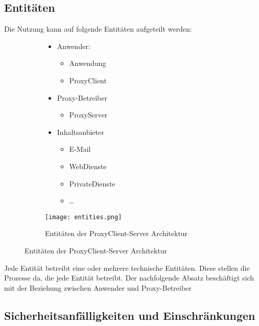 \documentclass[12pt, a4paper]{scrartcl}
\begin{document}
\subsection{Entitäten}
Die Nutzung kann auf folgende Entitäten aufgeteilt werden:
\begin{figure}[H]
    \centering
    \begin{subfigure}{0.45\textwidth}
        \begin{itemize}
            \item Anwender:
            \begin{itemize}
                \item Anwendung
                \item ProxyClient
            \end{itemize}
            \item Proxy-Betreiber
            \begin{itemize}
                \item ProxyServer
            \end{itemize}
            \item Inhaltsanbieter
            \begin{itemize}
                \item E-Mail
                \item WebDienste
                \item PrivateDienste
                \item \ldots
            \end{itemize}
        \end{itemize}
    \end{subfigure}
    \begin{subfigure}{0.5\textwidth}
        \centering
        \texttt{[image: entities.png]}
        \caption{Entitäten der ProxyClient-Server Architektur}
        \label{fig::enti}
    \end{subfigure}
\end{figure}

\noindent Jede Entität betreibt eine oder mehrere technische Entitäten. Diese stellen die Prozesse da, die jede Entität betreibt. Der nachfolgende Absatz beschäftigt sich mit der Beziehung zwischen Anwender und Proxy-Betreiber
\subsection{Sicherheitsanfälligkeiten und Einschränkungen}
\end{document}
